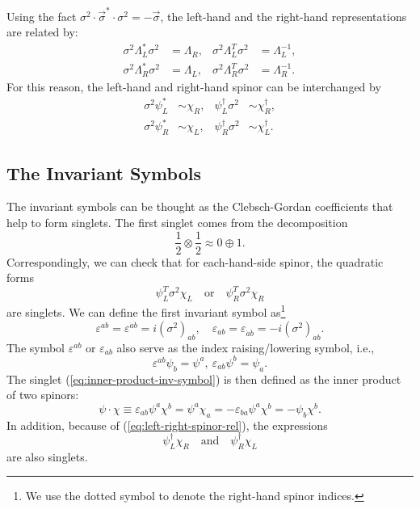 Using the fact $\sigma^2 \cdot \vec\sigma^* \cdot\sigma^2 = -\vec\sigma$, the left-hand and the right-hand representations are related by:
\begin{equation}
\begin{aligned}
	\sigma^2 \Lambda_L^* \sigma^2 &= \Lambda_R, & \sigma^2 \Lambda_L^T \sigma^2 &= \Lambda_L^{-1}, \\
	\sigma^2 \Lambda_R^* \sigma^2 &= \Lambda_L, & \sigma^2 \Lambda_R^T \sigma^2 &= \Lambda_R^{-1}.
\end{aligned}
\end{equation}
For this reason, the left-hand and right-hand spinor can be interchanged by
\begin{equation}
\begin{aligned}
	\sigma^2 \psi_L^* &\sim \chi_R, & \psi_L^\dagger \sigma^2 &\sim \chi^\dagger_R, \\
	\sigma^2 \psi_R^* &\sim \chi_L, & \psi^\dagger_R \sigma^2 &\sim \chi^\dagger_L.
	\label{eq:left-right-spinor-rel}
\end{aligned}
\end{equation}



\subsection{The Invariant Symbols}
The invariant symbols can be thought as the Clebsch-Gordan coefficients that help to form singlets.
The first singlet comes from the decomposition
\begin{equation*}
	\frac{1}{2}\otimes \frac{1}{2} \approx 0 \oplus 1.
\end{equation*}
Correspondingly, we can check that for each-hand-side spinor, the quadratic forms
\begin{equation}
	\psi_L^T\sigma^2\chi_L \quad \text{or} \quad 
	\psi_R^T\sigma^2\chi_R
	\label{eq:inner-product-inv-symbol}
\end{equation}
are singlets.
We can define the first invariant symbol as\footnote{We use the dotted symbol to denote the right-hand spinor indices.}
\begin{equation}
	\varepsilon^{ab} = \varepsilon^{\dot a \dot b} = i(\sigma^2)_{ab}, \quad
	\varepsilon_{ab} = \varepsilon_{\dot a \dot b} = -i(\sigma^2)_{ab}.
\end{equation}
The symbol $\varepsilon^{ab}$ or $\varepsilon_{ab}$ also serve as the index raising/lowering symbol, i.e.,
\begin{equation}
	\varepsilon^{ab}\psi_b = \psi^a,\ 
	\varepsilon_{ab}\psi^b = \psi_a.
\end{equation}
The singlet (\ref{eq:inner-product-inv-symbol}) is then defined as the inner product of two spinors:
\begin{equation}
	\psi\cdot\chi 
	\equiv \varepsilon_{ab}\psi^a\chi^b
	= \psi^a\chi_{a}
	= -\varepsilon_{ba}\psi^a\chi^b
	= -\psi_b\chi^b.
\end{equation}
In addition, because of (\ref{eq:left-right-spinor-rel}), the expressions
\begin{equation*}
	\psi_L^\dagger \chi_R \quad \text{and} \quad \psi_R^\dagger \chi_L
\end{equation*}
are also singlets.

